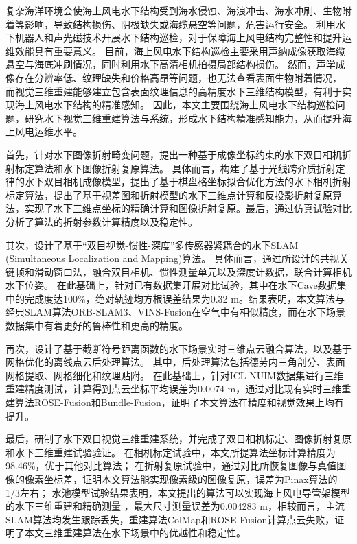 \cleardoublepage
{}

复杂海洋环境会使海上风电水下结构受到海水侵蚀、海浪冲击、海水冲刷、生物附着等影响，导致结构损伤、阴极缺失或海缆悬空等问题，危害运行安全。
利用水下机器人和声光磁技术开展水下结构巡检，对于保障海上风电结构完整性和提升运维效能具有重要意义。
目前，海上风电水下结构巡检主要采用声纳成像获取海缆悬空与海底冲刷情况，同时利用水下高清相机拍摄局部结构损伤。
然而，声学成像存在分辨率低、纹理缺失和价格高昂等问题，也无法查看表面生物附着情况，
而视觉三维重建能够建立包含表面纹理信息的高精度水下三维结构模型，有利于实现海上风电水下结构的精准感知。
因此，本文主要围绕海上风电水下结构巡检问题，研究水下视觉三维重建算法与系统，形成水下结构精准感知能力，从而提升海上风电运维水平。

首先，针对水下图像折射畸变问题，提出一种基于成像坐标约束的水下双目相机折射标定算法和水下图像折射复原算法。
具体而言，构建了基于光线跨介质折射定律的水下双目相机成像模型，提出了基于棋盘格坐标拟合优化方法的水下相机折射标定算法，提出了基于视差图和折射模型的水下三维点计算和反投影折射复原算法，实现了水下三维点坐标的精确计算和图像折射复原。最后，通过仿真试验对比分析了算法的折射参数计算精度以及稳定性。


其次，设计了基于“双目视觉-惯性-深度”多传感器紧耦合的水下SLAM (Simultaneous Localization and Mapping)算法。
具体而言，通过所设计的共视关键帧和滑动窗口法，融合双目相机、惯性测量单元以及深度计数据，联合计算相机水下位姿。
在此基础上，针对已有数据集开展对比试验，其中在水下Cave数据集中的完成度达100\%，绝对轨迹均方根误差结果为0.32 m。结果表明，本文算法与经典SLAM算法ORB-SLAM3、VINS-Fusion在空气中有相似精度，而在水下场景数据集中有着更好的鲁棒性和更高的精度。


再次，设计了基于截断符号距离函数的水下场景实时三维点云融合算法，以及基于网格优化的离线点云后处理算法。
其中，后处理算法包括德劳内三角剖分、表面网格提取、网格细化和纹理贴附。
在此基础上，针对ICL-NUIM数据集进行三维重建精度测试，计算得到点云坐标平均误差为0.0074 m，通过对比现有实时三维重建算法ROSE-Fusion和Bundle-Fusion，证明了本文算法在精度和视觉效果上均有提升。

最后，研制了水下双目视觉三维重建系统，并完成了双目相机标定、图像折射复原和水下三维重建试验验证。
在相机标定试验中，本文所提算法坐标计算精度为98.46\%，优于其他对比算法；
在折射复原试验中，通过对比所恢复图像与真值图像的像素坐标差，证明本文算法能实现像素级的图像复原，误差为Pinax算法的1/3左右；
水池模型试验结果表明，本文提出的算法可以实现海上风电导管架模型的水下三维重建和精确测量
，最大尺寸测量误差为0.004283 m，相较而言，主流SLAM算法均发生跟踪丢失，重建算法ColMap和ROSE-Fusion计算点云失败，证明了本文三维重建算法在水下场景中的优越性和稳定性。\newline



